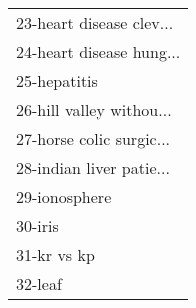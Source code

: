 \begin{table}[h]
\begin{center}
\begin{tabular}{l}
23-heart disease clev... &  \\
24-heart disease hung... &  \\
25-hepatitis &  \\
26-hill valley withou... &  \\
27-horse colic surgic... &  \\
28-indian liver patie... &  \\ \hline
29-ionosphere &  \\
30-iris &  \\
31-kr vs kp &  \\
32-leaf &  \\\end{tabular}\label{stratsALCKappa0Allallb}
\end{center}
\end{table}
